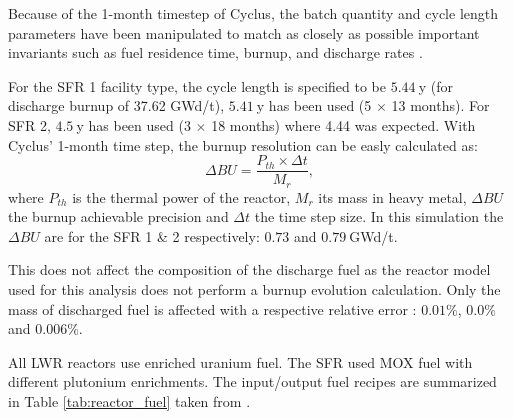 \documentclass[12pt]{article}
\begin{document}



Because of the 1-month timestep of Cyclus, the batch quantity and cycle length
parameters have been manipulated to match as closely as possible important
invariants such as fuel residence time, burnup, and discharge rates
\cite{B.Feng_calculation}.

For the SFR 1 facility type, the cycle length is specified to be $5.44~$y (for
discharge burnup of 37.62 GWd/t), $5.41~$y has been used (5 $\times$ 13 months). For
SFR 2, $4.5~$y has been used (3 $\times$ 18 months) where 4.44 was expected. With
Cyclus' 1-month time step, the burnup resolution can be easly calculated as:
\begin{equation} \Delta BU = \frac{P_{th} \times \Delta t}{M_{r}},
\end{equation}
\noindent where $P_{th}$ is the thermal power of the reactor, $M_{r}$ its mass in
heavy metal, $\Delta BU$ the burnup achievable precision and $\Delta t$ the time
step size. In this simulation the $\Delta BU$ are for the SFR 1 \& 2 respectively:
$0.73$ and $0.79~$GWd/t.

This does not affect the composition of the discharge fuel as the reactor model
used for this analysis does not perform a burnup evolution calculation. Only the
mass of discharged fuel is affected with a respective relative error : $0.01 \%$,
$0.0 \%$ and $0.006 \%$.


All LWR reactors use enriched uranium fuel. The SFR used MOX fuel with
different plutonium enrichments. The input/output fuel recipes are summarized
in Table \ref{tab:reactor_fuel} taken from \cite{B.Feng_calculation}.
\end{document}
